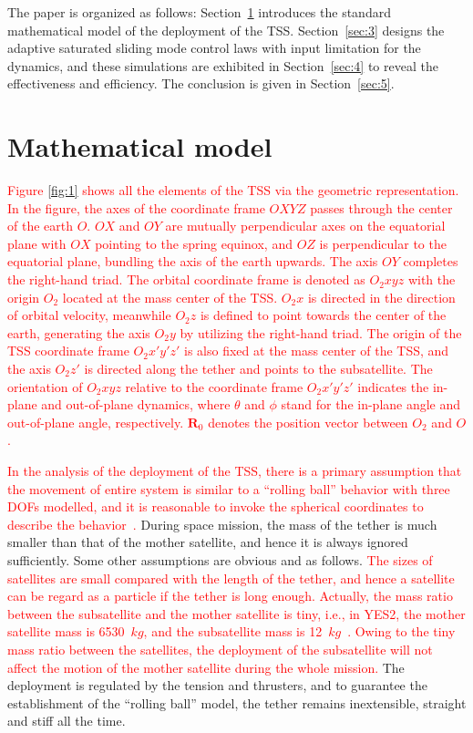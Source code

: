 \documentclass[3p]{elsarticle}
\theoremstyle{plain}
\theoremstyle{remark}
\begin{document}
The paper is organized as follows: Section~\ref{sec:2} introduces the standard mathematical model of the deployment of the TSS. Section~\ref{sec:3} designs the adaptive saturated sliding mode control laws with input limitation for the dynamics, and these simulations are exhibited in Section~\ref{sec:4} to reveal the effectiveness and efficiency. The conclusion is given in Section~\ref{sec:5}.
\section{Mathematical model}\label{sec:2}
\textcolor{red}{Figure \ref{fig:1} shows all the elements of the TSS via the geometric representation. In the figure, the axes of the coordinate frame $OXYZ$ passes through the center of the earth $O$. $OX$ and $OY$ are mutually perpendicular axes on the equatorial plane with $OX$ pointing to the spring equinox, and $OZ$ is perpendicular to the equatorial plane, bundling the axis of the earth upwards. The axis $OY$ completes the right-hand triad. The orbital coordinate frame is denoted as $O_2xyz$ with the origin $O_2$ located at the mass center of the TSS. $O_2x$ is directed in the direction of orbital velocity, meanwhile $O_2z$ is defined to point towards the center of the earth, generating the axis $O_2y$ by utilizing the right-hand triad. The origin of the TSS coordinate frame $O_2x'y'z'$ is also fixed at the mass center of the TSS, and the axis $O_2z'$ is directed along the tether and points to the subsatellite. The orientation of $O_2xyz$ relative to the coordinate frame $O_2x'y'z'$ indicates the in-plane and out-of-plane dynamics, where $\theta$ and $\phi$ stand for the in-plane angle and out-of-plane angle, respectively. $\bm R_0$ denotes the position vector between $O_2$ and $O$.}\par
\textcolor{red}{In the analysis of the deployment of the TSS, there is a primary assumption that the movement of entire system is similar to a ``rolling ball'' behavior with three DOFs modelled, and it is reasonable to invoke the spherical coordinates to describe the behavior~\cite{Williams2008}.} During space mission, the mass of the tether is much smaller than that of the mother satellite, and hence it is always ignored sufficiently. Some other assumptions are obvious and as follows. \textcolor{red}{The sizes of satellites are small compared with the length of the tether, and hence a satellite can be regard as a particle if the tether is long enough. Actually, the mass ratio between the subsatellite and the mother satellite is tiny, i.e., in YES2, the mother satellite mass is 6530~$kg$, and the subsatellite mass is 12~$kg$~\cite{Williams2008}.  Owing to the tiny mass ratio between the satellites, the deployment of the subsatellite will not affect the motion of the mother satellite during the whole mission.} The deployment is regulated by the tension and thrusters, and to guarantee the establishment of the ``rolling ball'' model, the tether remains inextensible, straight and stiff all the time.\par
\end{document}
